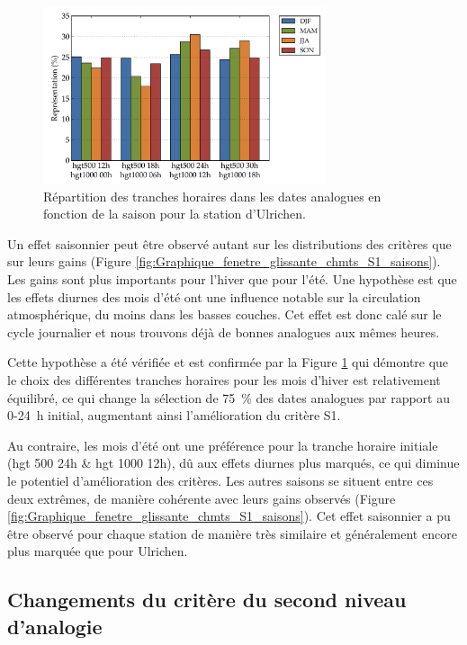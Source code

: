 \documentclass[hess]{copernicus}
\begin{document}
\begin{figure}[htb]
	\includegraphics[width=8.3cm]{figures/Graphique_fenetre_glissante_heures_fct_saison.pdf}
	\caption{Répartition des tranches horaires dans les dates analogues en fonction de la saison pour la station d'Ulrichen.}
	\label{fig:Graphique_fenetre_glissante_heures_fct_saison}
\end{figure}

Un effet saisonnier peut être observé autant sur les distributions des critères que sur leurs gains (Figure \ref{fig:Graphique_fenetre_glissante_chmts_S1_saisons}). Les gains sont plus importants pour l'hiver que pour l'été. Une hypothèse est que les effets diurnes des mois d'été ont une influence notable sur la circulation atmosphérique, du moins dans les basses couches. Cet effet est donc calé sur le cycle journalier et nous trouvons déjà de bonnes analogues aux mêmes heures. 

Cette hypothèse a été vérifiée et est confirmée par la Figure \ref{fig:Graphique_fenetre_glissante_heures_fct_saison} qui démontre que le choix des différentes tranches horaires pour les mois d'hiver est relativement équilibré, ce qui change la sélection de 75~\% des dates analogues par rapport au 0-24~h initial, augmentant ainsi l'amélioration du critère S1. 

Au contraire, les mois d'été ont une préférence pour la tranche horaire initiale (hgt 500 24h \& hgt 1000 12h), dû aux effets diurnes plus marqués, ce qui diminue le potentiel d'amélioration des critères. Les autres saisons se situent entre ces deux extrêmes, de manière cohérente avec leurs gains observés (Figure \ref{fig:Graphique_fenetre_glissante_chmts_S1_saisons}). Cet effet saisonnier a pu être observé pour chaque station de manière très similaire et généralement encore plus marquée que pour Ulrichen.


\subsection{Changements du critère du second niveau d'analogie}
\end{document}
